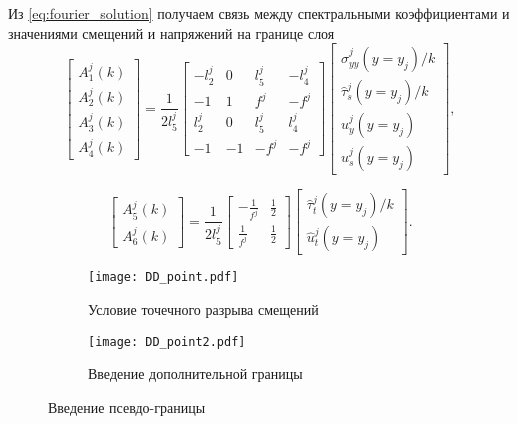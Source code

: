 Из \eqref{eq:fourier_solution} получаем связь между спектральными коэффициентами и значениями смещений и напряжений на границе слоя
\begin{equation}
    \label{eq:As}
    \left[
    \begin{array}{c}
    A^{j}_{1}(k) \\
    A^{j}_{2}(k)\\
    A^{j}_{3}(k) \\
    A^{j}_{4}(k)
    \end{array}
    \right]
    = \frac{1}{2l^j_5}
    \left[
    \begin{array}{cccc}
        -l^j_2 & 0 & l^j_5 & -l^j_4 \\
        -1 & 1 & f^j & -f^j \\
        l^j_2 & 0 & l^j_5 & l^j_4 \\
        -1 & -1 & -f^j & -f^j
    \end{array}
    \right]
    \left[
    \begin{array}{c}
    \hat{\sigma}^{j}_{yy}(y=y_j)/k \\
    \hat{\tau}^{j}_{s}(y=y_j)/k\\
    \hat{u}^{j}_{y}(y=y_j) \\
    \hat{u}^{j}_{s}(y=y_j) 
    \end{array}
    \right],
\end{equation}

\begin{equation}
    \label{eq:At}
    \left[
    \begin{array}{c}
        A^{j}_{5}(k) \\
        A^{j}_{6}(k)
    \end{array}
    \right]
    = \frac{1}{2l^j_5}
    \left[
    \begin{array}{cc}
        -\frac{1}{f^j} & \frac{1}{2} \\
        \frac{1}{f^j} & \frac{1}{2}
    \end{array}
    \right]
    \left[
    \begin{array}{c}
    \hat{\tau}^{j}_{t}(y=y_j)/k\\
    \hat{u}^{j}_{t}(y=y_j) 
    \end{array}
    \right].
\end{equation}

\begin{figure}[htbp]
    \centering
    \begin{subfigure}[b]{0.45\textwidth}
        \centering
        \texttt{[image: DD\_point.pdf]}
        \caption{Условие точечного разрыва смещений}
        \label{fig:DD_point}
    \end{subfigure}
    \hfill 
    \begin{subfigure}[b]{0.45\textwidth}
        \centering
        \texttt{[image: DD\_point2.pdf]}
        \caption{Введение дополнительной границы}
        \label{fig:pseudointerface}
    \end{subfigure}
    \caption{Введение псевдо-границы}
    \label{fig:Pseudointerface}
\end{figure}

